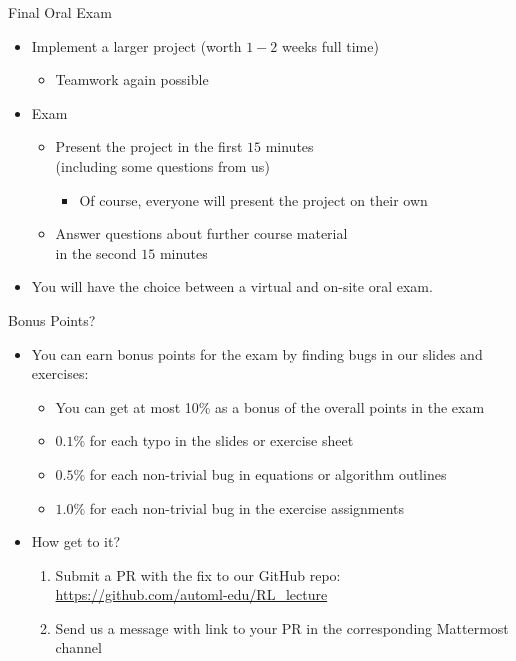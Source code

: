 \begin{frame}[c]{Final Oral Exam}
	
	\begin{itemize}
		\item Implement a larger project (worth $1-2$ weeks full time)
		\begin{itemize}
			\item Teamwork again possible
		\end{itemize}
		\item Exam
		\begin{itemize}
			\item Present the project in the first $15$ minutes\\ (including some questions from us)
			\begin{itemize}
				\item Of course, everyone will present the project on their own
			\end{itemize}
			\item Answer questions about further course material\\ in the second $15$ minutes
		\end{itemize}	
		\item You will have the choice between a virtual and on-site oral exam.
	\end{itemize}
	
\end{frame}
\begin{frame}[c]{Bonus Points?}
	
	\begin{itemize}
		\item You can earn bonus points for the exam by finding bugs in our slides and exercises:
		\begin{itemize}
			\item You can get at most 10\% as a bonus of the overall points in the exam
			\item $0.1\%$ for each typo in the slides or exercise sheet
			\item $0.5\%$ for each non-trivial bug in equations or algorithm outlines
			\item $1.0\%$ for each non-trivial bug in the exercise assignments
		\end{itemize}
		\pause
		\item How get to it?
		\begin{enumerate}
			\item Submit a PR with the fix to our GitHub repo: \url{https://github.com/automl-edu/RL_lecture}
			\item Send us a message with link to your PR in the corresponding Mattermost channel
		\end{enumerate}
		
	\end{itemize}
	
\end{frame}
